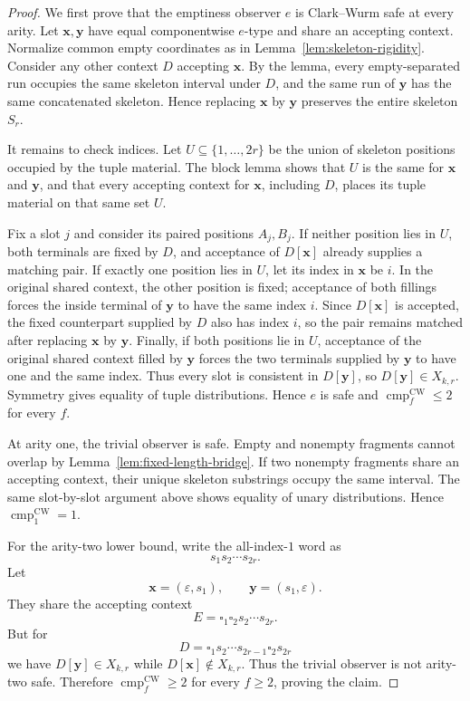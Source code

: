 \documentclass[11pt]{article}
\theoremstyle{definition}
\theoremstyle{remark}
\newcommand{\eps}{\varepsilon}
\newcommand{\cmp}{\operatorname{cmp}}
\newcommand{\blank}{\square}
\begin{document}
\begin{proof}
We first prove that the emptiness observer $e$ is Clark--Wurm safe at every
arity.  Let $\mathbf x,\mathbf y$ have equal componentwise $e$-type and share
an accepting context.  Normalize common empty coordinates as in
Lemma~\ref{lem:skeleton-rigidity}.  Consider any other context $D$ accepting
$\mathbf x$.  By the lemma, every empty-separated run occupies the same
skeleton interval under $D$, and the same run of $\mathbf y$ has the same
concatenated skeleton.  Hence replacing $\mathbf x$ by $\mathbf y$ preserves
the entire skeleton $S_r$.

It remains to check indices.  Let $U\subseteq\{1,\ldots,2r\}$ be the
union of skeleton positions occupied by the tuple material.  The block lemma
shows that $U$ is the same for $\mathbf x$ and $\mathbf y$, and that every
accepting context for $\mathbf x$, including $D$, places its tuple material on
that same set $U$.

Fix a slot $j$ and consider its paired positions $A_j,B_j$.  If neither
position lies in $U$, both terminals are fixed by $D$, and acceptance of
$D[\mathbf x]$ already supplies a matching pair.  If exactly one position lies
in $U$, let its index in $\mathbf x$ be $i$.  In the original shared context,
the other position is fixed; acceptance of both fillings forces the inside
terminal of $\mathbf y$ to have the same index $i$.  Since $D[\mathbf x]$ is
accepted, the fixed counterpart supplied by $D$ also has index $i$, so the
pair remains matched after replacing $\mathbf x$ by $\mathbf y$.  Finally, if
both positions lie in $U$, acceptance of the original shared context filled by
$\mathbf y$ forces the two terminals supplied by $\mathbf y$ to have one and
the same index.  Thus every slot is consistent in $D[\mathbf y]$, so
$D[\mathbf y]\in X_{k,r}$.  Symmetry gives equality of tuple distributions.
Hence $e$ is safe and $\cmp_f^{\mathrm{CW}}\le2$ for every $f$.

At arity one, the trivial observer is safe.  Empty and nonempty fragments
cannot overlap by Lemma~\ref{lem:fixed-length-bridge}.  If two nonempty
fragments share an accepting context, their unique skeleton substrings occupy
the same interval.  The same slot-by-slot argument above shows equality of
unary distributions.  Hence $\cmp_1^{\mathrm{CW}}=1$.

For the arity-two lower bound, write the all-index-$1$ word as
\[
 s_1s_2\cdots s_{2r}.
\]
Let
\[
 \mathbf x=(\eps,s_1),\qquad
 \mathbf y=(s_1,\eps).
\]
They share the accepting context
\[
 E=\blank_1\blank_2s_2\cdots s_{2r}.
\]
But for
\[
 D=\blank_1s_2\cdots s_{2r-1}\blank_2s_{2r}
\]
we have $D[\mathbf y]\in X_{k,r}$ while
$D[\mathbf x]\notin X_{k,r}$.  Thus the trivial observer is not arity-two
safe.  Therefore $\cmp_f^{\mathrm{CW}}\ge2$ for every $f\ge2$, proving the
claim.
\end{proof}
\end{document}

